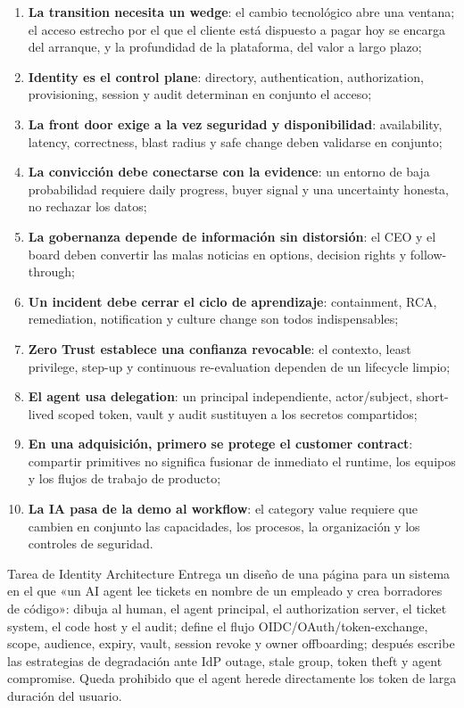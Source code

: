 \documentclass[a4paper]{article}
\begin{document}
\begin{enumerate}
  \item \textbf{La transition necesita un wedge}: el cambio tecnológico abre una ventana; el acceso estrecho por el que el cliente está dispuesto a pagar hoy se encarga del arranque, y la profundidad de la plataforma, del valor a largo plazo;
  \item \textbf{Identity es el control plane}: directory, authentication, authorization, provisioning, session y audit determinan en conjunto el acceso;
  \item \textbf{La front door exige a la vez seguridad y disponibilidad}: availability, latency, correctness, blast radius y safe change deben validarse en conjunto;
  \item \textbf{La convicción debe conectarse con la evidence}: un entorno de baja probabilidad requiere daily progress, buyer signal y una uncertainty honesta, no rechazar los datos;
  \item \textbf{La gobernanza depende de información sin distorsión}: el CEO y el board deben convertir las malas noticias en options, decision rights y follow-through;
  \item \textbf{Un incident debe cerrar el ciclo de aprendizaje}: containment, RCA, remediation, notification y culture change son todos indispensables;
  \item \textbf{Zero Trust establece una confianza revocable}: el contexto, least privilege, step-up y continuous re-evaluation dependen de un lifecycle limpio;
  \item \textbf{El agent usa delegation}: un principal independiente, actor/subject, short-lived scoped token, vault y audit sustituyen a los secretos compartidos;
  \item \textbf{En una adquisición, primero se protege el customer contract}: compartir primitives no significa fusionar de inmediato el runtime, los equipos y los flujos de trabajo de producto;
  \item \textbf{La IA pasa de la demo al workflow}: el category value requiere que cambien en conjunto las capacidades, los procesos, la organización y los controles de seguridad.
\end{enumerate}

\begin{importantbox}{Tarea de Identity Architecture}
Entrega un diseño de una página para un sistema en el que «un AI agent lee tickets en nombre de un empleado y crea borradores de código»: dibuja al human, el agent principal, el authorization server, el ticket system, el code host y el audit; define el flujo OIDC/OAuth/token-exchange, scope, audience, expiry, vault, session revoke y owner offboarding; después escribe las estrategias de degradación ante IdP outage, stale group, token theft y agent compromise. Queda prohibido que el agent herede directamente los token de larga duración del usuario.
\end{importantbox}
\end{document}
